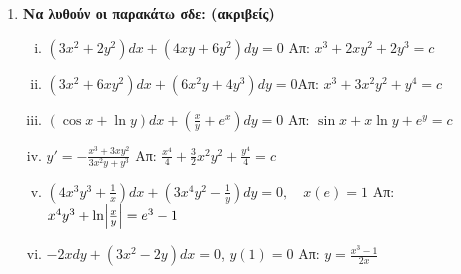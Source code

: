 \begin{enumerate}

  \item {\bfseries Να λυθούν οι παρακάτω σδε: (ακριβείς)}
    \begin{enumerate}[i)]
      \item $ (3x^{2}+2y^{2})dx+(4xy+6y^{2})dy=0  $ 
        \hfill Απ: $ x^{3}+2xy^{2}+2y^{3}=c $ 
      \item $(3x^2+6xy^2)dx+(6x^2y+4y^3)dy=0$\hfill Απ: $x^3+3x^2y^2+y^4=c$
      \item $ (\cos{x} + \ln{y})dx + \left(\frac{x}{y} + e^{x}\right)dy=0 $ 
        \hfill Απ: $ \sin{x} + x \ln{y} + e^{y}=c $ 
      \item $ y'=- \frac{x^{3}+3xy^{2}}{3x^{2}y+y^{3}} $ 
        \hfill Απ: $ \frac{x^{4}}{4}+\frac{3}{2} x^{2}y^{2}+\frac{y^{4}}{4} = c $ 
      \item $\left(4x^3y^3+\frac{1}{x}\right)dx+\left(3x^4y^2-
        \frac{1}{y}\right)dy=0, \quad x(e)=1$
        \hfill Απ: $x^4y^3+\ln \Bigl|\frac{x}{y}\Bigr|=e^3-1$
      \item $ -2xdy + (3x^{2}-2y)dx=0 $, \quad $ y(1)=0 $ 
        \hfill Απ: $ y= \frac{x^{3}-1}{2x} $ 
    \end{enumerate}


\end{enumerate}
